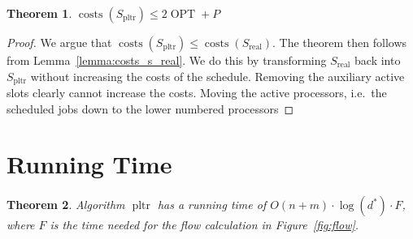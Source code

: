 \documentclass[a4paper]{article}
\DeclareMathOperator{\costs}{costs}
\DeclareMathOperator{\opt}{OPT}
\DeclareMathOperator{\pltr}{pltr}
\DeclareMathOperator{\real}{real}
\newtheorem{theorem}{Theorem}
\begin{document}
\begin{theorem}
  $\costs(S_{\pltr}) \leq 2 \opt + P$
\end{theorem}
\begin{proof}
  We argue that $\costs(S_{\pltr}) \leq \costs(S_{\real})$.
  The theorem then follows from Lemma~\ref{lemma:costs_s_real}.
  We do this by transforming $S_{\real}$ back into $S_{\pltr}$ without increasing the costs of the schedule.
  Removing the auxiliary active slots clearly cannot increase the costs.
  Moving the active processors, i.e.\ the scheduled jobs down to the lower numbered processors
\end{proof}

\section{Running Time}
\begin{theorem}
  Algorithm $\pltr$ has a running time of $O(n + m) \cdot \log(d^*) \cdot F$, where $F$ is the time needed for the flow calculation in Figure~\ref{fig:flow}.
\end{theorem}
\end{document}
